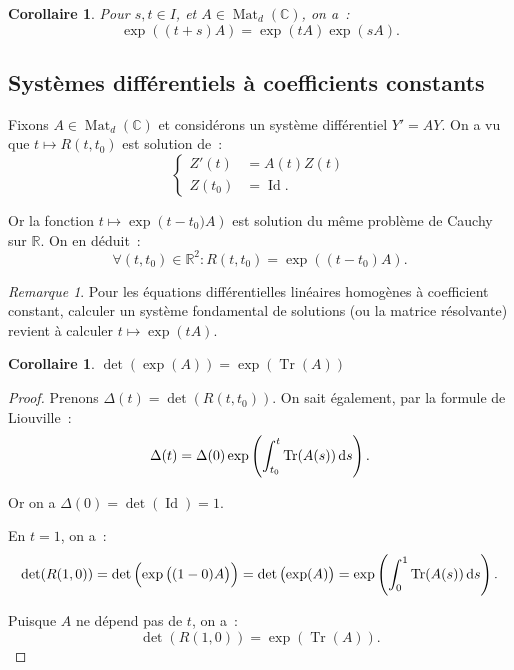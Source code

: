 \documentclass{report}
\newtheorem{cor}[thm]{Corollaire}
\theoremstyle{definition}
\theoremstyle{remark}
\newtheorem*{rmq}{Remarque}
\numberwithin{equation}{section}
\newcommand{\C}{\mathbb C}
\newcommand{\R}{\mathbb R}
\DeclareMathOperator{\Mat}{Mat}
\DeclareMathOperator{\Tr}{Tr}
\DeclareMathOperator{\Id}{Id}
\begin{document}
			\begin{cor} Pour $s, t \in I$, et $A \in \Mat_d(\C)$, on a~:
			\begin{equation}
				\exp\left((t+s)A\right) = \exp(tA)\exp(sA).
			\end{equation}
			\end{cor}

		\subsection{Systèmes différentiels à coefficients constants}
			Fixons $A \in \Mat_d(\C)$ et considérons un système différentiel $Y' = AY$. On a vu que $t \mapsto R(t, t_0)$ est solution de~:
			\begin{equation}
				\begin{cases}
				Z'(t) &= A(t)Z(t) \\
				Z(t_0) &= \Id.
			\end{cases}
			\end{equation}

			Or la fonction $t \mapsto \exp\left(t-t_0)A\right)$ est solution du même problème de Cauchy sur $\R$. On en déduit~:
			\begin{equation}
				\forall (t, t_0) \in \R^2 : R(t, t_0) = \exp\left((t-t_0)A\right).
			\end{equation}

			\begin{rmq} Pour les équations différentielles linéaires homogènes à coefficient constant, calculer un système fondamental de solutions (ou la matrice
			résolvante) revient à calculer $t \mapsto \exp(tA)$.
			\end{rmq}

			\begin{cor} $\det(\exp(A)) = \exp(\Tr(A))$
			\end{cor}

			\begin{proof} Prenons $\Delta(t) = \det(R(t, t_0))$. On sait également, par la formule de Liouville~:
			\begin{equation}
				\Delta(t) = \Delta(0)\exp\left(\int_{t_0}^t\Tr(A(s))\dif s\right).
			\end{equation}

			Or on a $\Delta(0) = \det(\Id) = 1$.

			En $t=1$, on a~:
			\begin{equation}
				\det(R(1, 0)) = \det\left(\exp\left((1-0)A\right)\right) = \det\left(\exp(A)\right) = \exp\left(\int_0^1\Tr(A(s))\dif s\right).
			\end{equation}

			Puisque $A$ ne dépend pas de $t$, on a~:
			\begin{equation}
				\det(R(1, 0)) = \exp\left(\Tr(A)\right).
			\end{equation}
			\end{proof}
\end{document}
